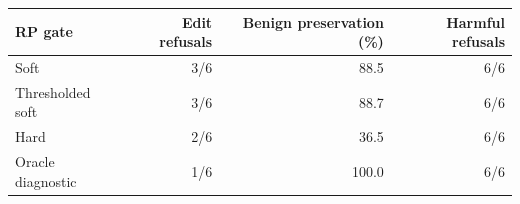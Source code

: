 \begin{tabular}{@{}lrrr@{}}
\toprule
RP gate & Edit refusals & Benign preservation (\%) & Harmful refusals \\
\midrule
Soft & 3/6 & 88.5 & 6/6 \\
Thresholded soft & 3/6 & 88.7 & 6/6 \\
Hard & 2/6 & 36.5 & 6/6 \\
Oracle diagnostic & 1/6 & 100.0 & 6/6 \\
\bottomrule
\end{tabular}
